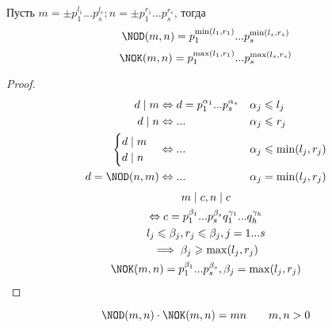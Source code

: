 \documentclass[main]{subfiles}
\begin{document}
\begin{proposition}
    Пусть $m =\pm p_1^{l_1} ... p_s^{l_s}; n = \pm p_1^{r_1} ... p_s^{r_s}$, тогда
    \[\NOD(m,n) = p_1^{\min(l_1, r_1)}... p_s^{\min(l_s, r_s)}\]
    \[\NOK(m,n) = p_1^{\max(l_1, r_1)}... p_s^{\max(l_s, r_s)}\]
\end{proposition}
\begin{proof}
    \begin{align*}
        d \mid m    & \Leftrightarrow d = p_1^{\alpha_1} ... p_s^{\alpha_s} & \alpha_j & \le l_j            \\
        d \mid n    & \Leftrightarrow ...                                   & \alpha_j & \le r_j            \\
        \begin{cases}
            d \mid m \\
            d \mid n
        \end{cases}
                    & \Leftrightarrow ...                                   & \alpha_j & \le \min(l_j, r_j) \\
        d=\NOD(n,m) & \Leftrightarrow ...                                   & \alpha_j & = \min(l_j, r_j)
    \end{align*}
    \begin{gather*}
        m\mid c, n \mid c\\
        \Leftrightarrow c = p_1^{\beta_1}... p_s^{\beta_s} q_1^{\gamma_1}...q_h^{\gamma_h}\\
        l_j\le \beta_j, r_j \le \beta_j, j=1...s\\
        \implies \beta_j \ge \max(l_j, r_j)\\
        \NOK(m,n) = p_1^{\beta_1}... p_s^{\beta_s}, \beta_j = \max(l_j, r_j)
    \end{gather*}
\end{proof}

\begin{corollary}
    \[\NOD(m,n) \cdot \NOK(m,n) = mn\qquad m,n >0\]
\end{corollary}
\end{document}
